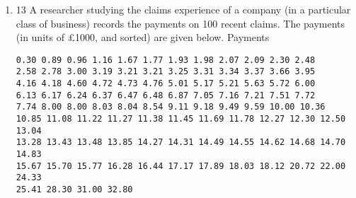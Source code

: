\documentclass[a4paper,12pt]{article}
\begin{document}
\begin{enumerate}
\item
13 A researcher studying the claims experience of a company (in a particular class of
business) records the payments on 100 recent claims. The payments (in units of
£1000, and sorted) are given below.
Payments
\begin{verbatim}
0.30 0.89 0.96 1.16 1.67 1.77 1.93 1.98 2.07 2.09 2.30 2.48
2.58 2.78 3.00 3.19 3.21 3.21 3.25 3.31 3.34 3.37 3.66 3.95
4.16 4.18 4.60 4.72 4.73 4.76 5.01 5.17 5.21 5.63 5.72 6.00
6.13 6.17 6.24 6.37 6.47 6.48 6.87 7.05 7.16 7.21 7.51 7.72
7.74 8.00 8.00 8.03 8.04 8.54 9.11 9.18 9.49 9.59 10.00 10.36
10.85 11.08 11.22 11.27 11.38 11.45 11.69 11.78 12.27 12.30 12.50 13.04
13.28 13.43 13.48 13.85 14.27 14.31 14.49 14.55 14.62 14.68 14.70 14.83
15.67 15.70 15.77 16.28 16.44 17.17 17.89 18.03 18.12 20.72 22.00 24.33
25.41 28.30 31.00 32.80
\end{verbatim}


\end{enumerate}
\end{document}
